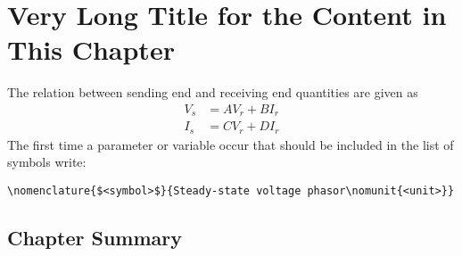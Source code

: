 
\chapter[Short Title]{Very Long Title for the Content in This Chapter}
\label{chap:chap2}

The relation between sending end and receiving end quantities are given as
%
\begin{subequations}\label{eq:GenericTwoPort}
\begin{align}
  V_s &= AV_r + BI_r \\
  I_s &= CV_r + DI_r 
\end{align}
\end{subequations}%
%
%
%
%
%
The first time a parameter or variable occur that should be included in the list
of symbols write:

\verb+\nomenclature{$<symbol>$}{Steady-state voltage phasor\nomunit{<unit>}}+



\section{Chapter Summary}
\label{sec:SummaryChap2}






